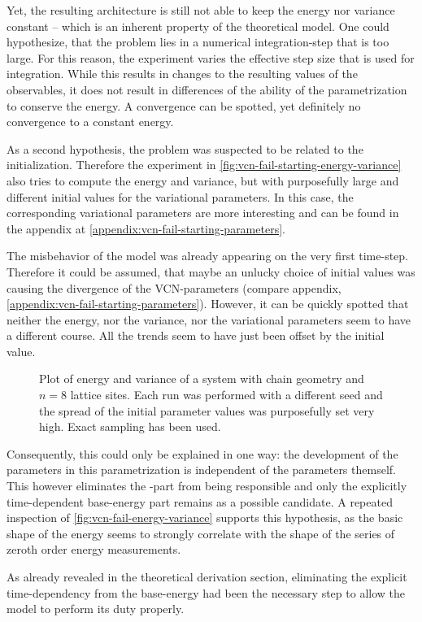 Yet, the resulting architecture is still not able to keep the energy nor variance constant -- which is an inherent property of the theoretical model.
One could hypothesize, that the problem lies in a numerical integration-step that is too large.
For this reason, the experiment varies the effective step size that is used for integration.
While this results in changes to the resulting values of the observables, it does not result in differences of the ability of the parametrization to conserve the energy.
A convergence can be spotted, yet definitely no convergence to a constant energy.

As a second hypothesis, the problem was suspected to be related to the initialization. 
Therefore the experiment in \autoref{fig:vcn-fail-starting-energy-variance} also tries to compute the energy and variance, but with purposefully large and different initial values for the variational parameters.
In this case, the corresponding variational parameters are more interesting and can be found in the appendix at \ref{appendix:vcn-fail-starting-parameters}.

The misbehavior of the model was already appearing on the very first time-step.
Therefore it could be assumed, that maybe an unlucky choice of initial values was causing the divergence of the VCN-parameters (compare appendix, \ref{appendix:vcn-fail-starting-parameters}).
However, it can be quickly spotted that neither the energy, nor the variance, nor the variational parameters seem to have a different course.
All the trends seem to have just been offset by the initial value.

\begin{figure}[htbp]
    \centering
    \vspace{-0.2cm}
    \caption{
            Plot of energy and variance of a system with chain geometry and $n=8$ lattice sites.
            Each run was performed with a different seed and the spread of the initial parameter values was purposefully set very high.
            Exact sampling has been used.
        }
    \label{fig:vcn-fail-starting-energy-variance}
\end{figure}

Consequently, this could only be explained in one way: the development of the parameters in this parametrization is independent of the parameters themself.
This however eliminates the \HNOft[N]-part from being responsible and only the explicitly time-dependent base-energy part remains as a possible candidate.
A repeated inspection of \autoref{fig:vcn-fail-energy-variance} supports this hypothesis, as the basic shape of the energy seems to strongly correlate with the shape of the series of zeroth order energy measurements.

As already revealed in the theoretical derivation section, eliminating the explicit time-dependency from the base-energy had been the necessary step to allow the model to perform its duty properly.